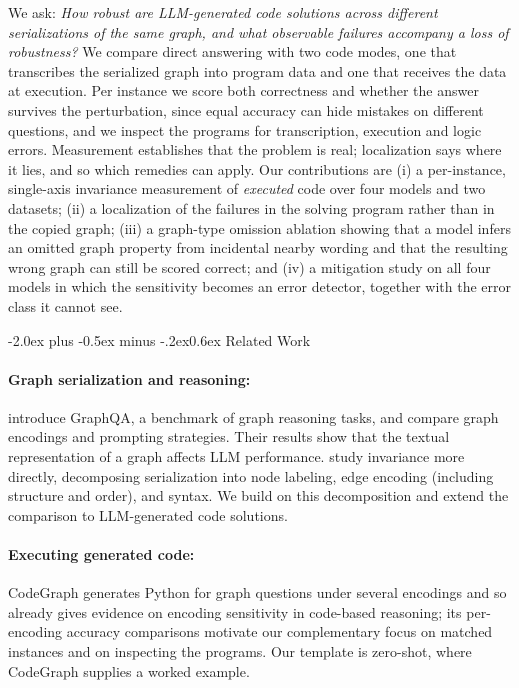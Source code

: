 \documentclass[11pt]{article}
\makeatletter
\renewcommand\section{\@startsection{section}{1}{\z@}
  {-2.0ex plus -0.5ex minus -.2ex}{0.6ex}
  {\large\bfseries\centering}}
\makeatother
\begin{document}
We ask: \emph{How robust are LLM-generated code solutions across different
serializations of the same graph, and what observable failures accompany a loss of
robustness?} We compare direct answering with two code modes, one that transcribes
the serialized graph into program data and one that receives the data at execution.
Per instance we score both correctness and whether the answer survives the
perturbation, since equal accuracy can hide mistakes on different questions, and we
inspect the programs for transcription, execution and logic errors.
Measurement establishes that the problem is real; localization says where it lies,
and so which remedies can apply. Our
contributions are (i) a per-instance, single-axis invariance measurement of
\emph{executed} code over four models and two datasets; (ii) a localization of the
failures in the solving program rather than in the copied graph; (iii) a graph-type omission ablation showing that a model infers an omitted graph property from
incidental nearby wording and that the resulting wrong graph can still be scored
correct; and (iv) a mitigation study on all four models in which the sensitivity
becomes an error detector, together with the error class it cannot see.

\section{Related Work}
\label{sec:related-work}
\paragraph{Graph serialization and reasoning:}
\citet{fatemi} introduce GraphQA, a benchmark of graph reasoning tasks, and
compare graph encodings and prompting strategies. Their results show that the
textual representation of a graph affects LLM performance. \citet{herbst} study invariance
more directly, decomposing serialization into node labeling, edge encoding
(including structure and order), and syntax. We build on this decomposition
and extend the comparison to LLM-generated code solutions.

\paragraph{Executing generated code:}
CodeGraph \citep{cai} generates Python for graph questions under several encodings
and so already gives evidence on encoding sensitivity in code-based reasoning; its
per-encoding accuracy comparisons motivate our complementary focus on matched
instances and on inspecting the programs. Our template is zero-shot, where CodeGraph
supplies a worked example.
\end{document}
